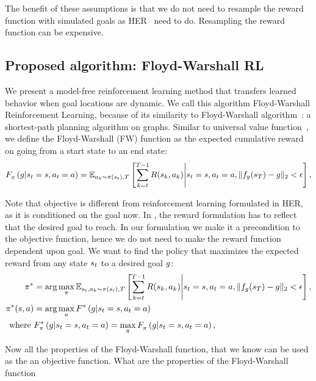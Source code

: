 The benefit of these assumptions is that we do not need to resample the reward
function with simulated goals as HER~\cite{andrychowicz2016learning} need to do.
Resampling the reward function can be expensive.

\subsection{Proposed algorithm: Floyd-Warshall RL}

We present a model-free reinforcement learning method that transfers
learned behavior when goal locations are dynamic. We call this algorithm
Floyd-Warshall Reinforcement Learning, because of its similarity to
Floyd-Warshall algorithm~\cite{floydwarshall1962}:
a shortest-path planning algorithm on graphs. Similar
to universal value function~\cite{schaul2015universal}, we define the Floyd-Warshall
(FW) function as the expected cumulative reward on going from a start
state to an end state:
%
\begin{align}
\fwargs{\state_t = \state}{\act_t = \act}{\goal}{\policy}{} =
\E_{\act_k \sim \policy(\state_t),T}\left[ \sum_{k=t}^{T-1} \Rew(\state_k, \act_k) \middle\vert \state_t = \state, \act_t = \act, \|f_\goal(\state_T) - \goal\|_2 < \epsilon \right] ,
\end{align}%
%

Note that objective is different from reinforcement learning formulated in HER,
as it is conditioned on the goal now. In \citet{andrychowicz2016learning}, the
reward formulation has to reflect that the desired goal to reach. In our formulation
we make it a precondition to the objective function, hence we do not need to
make the reward function dependent upon goal.
We want to find the policy that maximizes the expected reward from any
state $\state_t$ to a desired goal $\goal$:
%
\begin{align}
  \policy^* &=
\arg \max_{\policy} \E_{\state_t, \act_k \sim \policy(\state_t), T}\left[ \sum_{k=t}^{T-1} \Rew(\state_k, \act_k) \middle\vert \state_t = \state, \act_t = \act, \|f_\goal(\state_T) - \goal\|_2 < \epsilon \right],
  \\
  \policy^*(\state, \act) &= \arg \max_{\act} \fwargs{\state_t = \state}{\act_t = \act}{\goal}{}{*}\\
\text{where } &\fwargs{\state_t = \state}{\act_t = \act}{\goal}{\policy}{*} = 
\max_{\policy} \fwargs{\state_t = \state}{\act_t = \act}{\goal}{\policy}{},
\end{align}%
%

Now all the properties of the Floyd-Warshall function, that we know can be used
as the an objective function. What are the properties of the Floyd-Warshall
function

